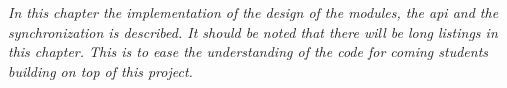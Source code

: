 \emph{In this chapter the implementation of the design of the modules, the \ac{api} and the synchronization is described. It should be noted that there will be long listings in this chapter. This is to ease the understanding of the code for coming students building on top of this project.} 